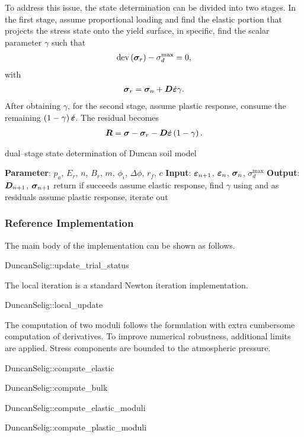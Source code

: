 To address this issue, the state determination can be divided into two stages. In the first stage, assume proportional loading and find the elastic portion that projects the stress state onto the yield surface, in specific, find the scalar parameter $\gamma$ such that
\begin{gather}\label{eq:ds_1st_stage_a}
\text{dev}\left(\bm{\sigma}_r\right)-\sigma_d^\text{max}=0,
\end{gather}
with
\begin{gather}\label{eq:ds_1st_stage_b}
\bm{\sigma}_r=\bm{\sigma}_n+\bm{D}\dot{\bm{\varepsilon}}\gamma.
\end{gather}
After obtaining $\gamma$, for the second stage, assume plastic response, consume the remaining $\left(1-\gamma\right)\dot{\bm{\varepsilon}}$. The residual becomes
\begin{gather}\label{eq:ds_two_stage}
\bm{R}=\bm{\sigma}-\bm{\sigma}_r-\bm{D}\dot{\bm{\varepsilon}}\left(1-\gamma\right).
\end{gather}

\begin{breakablealgorithm}
\caption{dual--stage state determination of Duncan soil model}\label{algo:duncan_two_stage}
\begin{algorithmic}
\State \textbf{Parameter}: $p_a$, $E_r$, $n$, $B_r$, $m$, $\phi_i$, $\Delta\phi$, $r_f$, $c$
\State \textbf{Input}: $\bm{\varepsilon}_{n+1}$, $\bm{\varepsilon}_n$, $\bm{\sigma}_n$, $\sigma_d^{\text{max}}$
\State \textbf{Output}: $\bm{D}_{n+1}$, $\bm{\sigma}_{n+1}$
\State return if  succeeds
\State assume elastic response, find $\gamma$ using  and  as residuals
\State assume plastic response, iterate out 
\end{algorithmic}
\end{breakablealgorithm}
\subsubsection{Reference Implementation}
The main body of the implementation can be shown as follows.
\begin{cppcode}
DuncanSelig::update_trial_status
\end{cppcode}

The local iteration is a standard Newton iteration implementation.
\begin{cppcode}
DuncanSelig::local_update
\end{cppcode}

The computation of two moduli follows the formulation with extra cumbersome computation of derivatives.
To improve numerical robustness, additional limits are applied. Stress components are bounded to the atmospheric pressure.
\begin{cppcode}
DuncanSelig::compute_elastic
\end{cppcode}

\begin{cppcode}
DuncanSelig::compute_bulk
\end{cppcode}

\begin{cppcode}
DuncanSelig::compute_elastic_moduli
\end{cppcode}

\begin{cppcode}
DuncanSelig::compute_plastic_moduli
\end{cppcode}